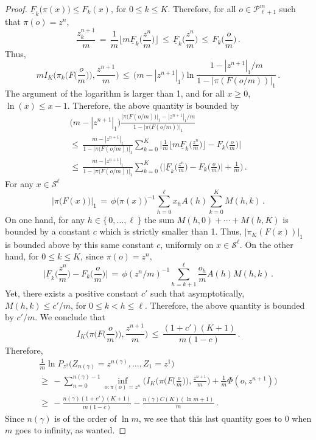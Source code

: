 \documentclass[a4paper,12pt]{article}
\theoremstyle{definition}
\theoremstyle{remark}
\def \cP {\mathcal{P}}
\def \cS {\mathcal{S}}
\def \g {\gamma}
\def \pml {\cP^m_{\ell +1}}
\def \zl {\{\, 0,\dots,\ell \,\}}
\begin{document}
\begin{proof}
${\underline{F}_k\big(\pi(x)\big)\leq F_k(x)}$, for $0\leq k\leq K$. Therefore,
for all $o\in\pml$ such that $\pi(o)=z^n$,
$$
\frac{z^{n+1}_k}{m}\,=\,
\frac{1}{m}\bigg\lfloor
m\underline{F}_k\Big(
\frac{z^{n}}{m}
\Big)
\bigg\rfloor\,\leq\,\underline{F}_k\Big(
\frac{z^{n}}{m}
\Big)\,\leq\,
F_k\Big(
\frac{o}{m}
\Big)\,.$$
Thus, 
$$mI_K\bigg(
\pi_k\Big(
F\Big(
\frac{o}{m}
\Big)
\Big),\frac{z^{n+1}}{m}
\bigg)\,\leq\,\big(
m-|z^{n+1}|_1
\big)\ln\frac{1-|z^{n+1}|_1/m}
{1-|\pi(F(o/m))|_1}\,.$$
The argument of the logarithm is larger than 1,
and for all $x\geq0$, $\ln(x)\leq x-1$. Therefore,
the above quantity is bounded by
\begin{multline*}
\big(
m-|z^{n+1}|_1
\big)
\frac{\displaystyle\big|\pi\big(F(o/m)\big)\big|_1-|z^{n+1}|_1/m}
{1-\displaystyle\big|\pi\big(F(o/m)\big)\big|_1}\\
\leq\,
\frac{m-|z^{n+1}|_1}{1-\displaystyle\big|\pi\big(F(o/m)\big)\big|_1}
\sum_{k=0}^K\bigg|
\frac{1}{m}\bigg\lfloor
m\underline{F}_k\Big(
\frac{z^{n}}{m}
\Big)
\bigg\rfloor-
F_k\Big(
\frac{o}{m}
\Big)
\bigg|\\
\leq\,\frac{m-|z^{n+1}|_1}{1-\displaystyle\big|\pi\big(F(o/m)\big)\big|_1}
\sum_{k=0}^K\Bigg(
\bigg|
\underline{F}_k\Big(
\frac{z^{n}}{m}
\Big)-
F_k\Big(
\frac{o}{m}
\Big)
\bigg|+\frac{1}{m}\Bigg)\,.
\end{multline*}
For any $x\in\cS^\ell$
$$\big|
\pi\big(
F(x)
\big)
\big|_1\,=\,
\phi\big(\pi(x)\big)^{-1}\sum_{h=0}^\ell
x_hA(h)\sum_{k=0}^KM(h,k)\,.$$
On one hand, for any $h\in\zl$ 
the sum $M(h,0)+\cdots+M(h,K)$ 
is bounded by a constant $c$ which is strictly 
smaller than 1. Thus,
$|\pi_K(F(x))|_1$ is bounded above by
this same constant $c$, uniformly on $x\in\cS^\ell$.
On the other hand,
for $0\leq k\leq K$, since $\pi(o)=z^n$,
$$
\bigg|
\underline{F}_k\Big(
\frac{z^{n}}{m}
\Big)-
F_k\Big(
\frac{o}{m}
\Big)
\bigg|\,=\,
\phi(z^n/m)^{-1}
\sum_{h=k+1}^\ell\frac{o_h}{m}A(h)M(h,k)\,.
$$
Yet,
there exists a positive constant $c'$
such that asymptotically, $M(h,k)\leq c'/m$,
for $0\leq k<h\leq \ell$.
Therefore, the above quantity
is bounded by $c'/m$.
We conclude that
$$I_K\bigg(
\pi\Big(
F\Big(
\frac{o}{m}
\Big)
\Big),\frac{z^{n+1}}{m}
\bigg)\,\leq\,\frac{(1+c')(K+1)}{m(1-c)}\,.$$
Therefore,
\begin{multline*}
\frac{1}{m}\ln P_{z^0}\big(
Z_{n(\g)}=z^{n(\g)},\dots,Z_1=z^1
\big)\\\geq\,
-\sum_{n=0}^{n(\g)-1}
\inf_{o:\pi(o)=z^n}
\bigg(I_K\bigg(
\pi\Big(
F\Big(
\frac{o}{m}
\Big)
\Big),\frac{z^{n+1}}{m}
\bigg)+\frac{1}{m}\Phi(o,z^{n+1})\bigg)\\
\geq\,-\frac{n(\g)(1+c')(K+1)}{m(1-c)
}-\frac{n(\g)C(K)(\ln m+1)}{m}\,.
\end{multline*}
Since $n(\g)$ is of the order of $\ln m$,
we see that this last quantity goes to 0 when $m$ goes to infinity,
as wanted.
\end{proof}
\end{document}

